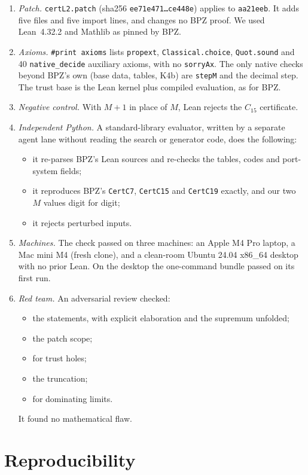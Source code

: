 \documentclass[11pt]{amsart}
\newcommand{\code}[1]{\texttt{#1}}
\begin{document}
\begin{enumerate}
\item \emph{Patch.} \code{certL2.patch} (sha256 \code{ee71e471\ldots ce448e}) applies to
\code{aa21eeb}. It adds five files and five import lines, and changes no BPZ proof. We used
Lean~4.32.2 and Mathlib as pinned by BPZ.
\item \emph{Axioms.} \code{\#print axioms} lists \code{propext}, \code{Classical.choice},
\code{Quot.sound} and 40 \code{native\_decide} auxiliary axioms, with no \code{sorryAx}. The only
native checks beyond BPZ's own (base data, tables, K4b) are \code{stepM} and the decimal step.
The trust base is the Lean kernel plus compiled evaluation, as for BPZ.
\item \emph{Negative control.} With $M+1$ in place of $M$, Lean rejects the $C_{15}$ certificate.
\item \emph{Independent Python.} A standard-library evaluator, written by a separate agent lane
without reading the search or generator code, does the following:
\begin{itemize}
\item it re-parses BPZ's Lean sources and re-checks the tables, codes and port-system fields;
\item it reproduces BPZ's \code{CertC7}, \code{CertC15} and \code{CertC19} exactly, and our two
$M$ values digit for digit;
\item it rejects perturbed inputs.
\end{itemize}
\item \emph{Machines.} The check passed on three machines: an Apple M4 Pro laptop, a Mac mini M4
(fresh clone), and a clean-room Ubuntu 24.04 x86\_64 desktop with no prior Lean. On the desktop
the one-command bundle passed on its first run.
\item \emph{Red team.} An adversarial review checked:
\begin{itemize}
\item the statements, with explicit elaboration and the supremum unfolded;
\item the patch scope;
\item for trust holes;
\item the truncation;
\item for dominating limits.
\end{itemize}
It found no mathematical flaw.
\end{enumerate}

\section{Reproducibility}
\end{document}
